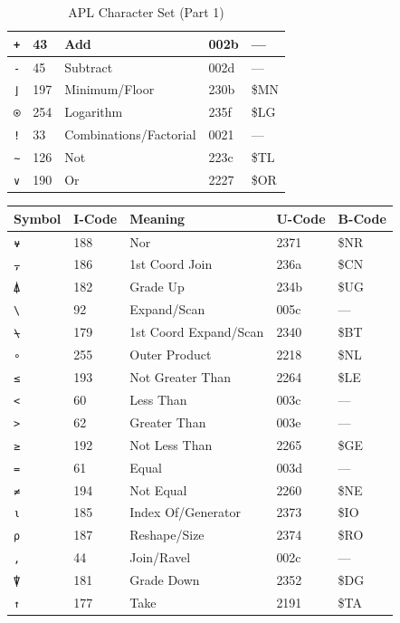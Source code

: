 \documentclass[a4paper,twoside,11pt]{article}
\begin{document}
\begin{table}
\begin{tabular}{||l|l|l|l|l||}
\texttt{+} & 43 & Add & 002b & ---\\\hline
\texttt{-} & 45 & Subtract & 002d & ---\\\hline
\texttt{⌋} & 197 & Minimum/Floor & 230b & \$MN\\\hline
\texttt{⍟} & 254 & Logarithm & 235f & \$LG\\\hline
\texttt{!} & 33 & Combinations/Factorial & 0021 & ---\\\hline
\texttt{∼} & 126 & Not & 223c & \$TL\\\hline
\texttt{∨} & 190 & Or & 2227 & \$OR\\\hline
\hline\hline
\end{tabular}
\caption{APL Character Set (Part 1)}
\label{tab:aplcs1}
\end{table}
\begin{table}
\centering
\begin{tabular}{||l|l|l|l|l||}
\hline\hline
Symbol&I-Code&Meaning&U-Code&B-Code\\
\hline
\texttt{⍱} & 188 & Nor & 2371 & \$NR\\\hline
\texttt{⍪} & 186 & 1st Coord Join & 236a & \$CN\\\hline
\texttt{⍋} & 182 & Grade Up & 234b & \$UG\\\hline
\texttt{\textbackslash{}} & 92 & Expand/Scan & 005c & ---\\\hline
\texttt{⍀} & 179 & 1st Coord Expand/Scan & 2340 & \$BT\\\hline
\texttt{∘} & 255 & Outer Product & 2218 & \$NL\\\hline
\texttt{≤} & 193 & Not Greater Than & 2264 & \$LE\\\hline
\texttt{<} & 60 & Less Than & 003c & ---\\\hline
\texttt{>} & 62 & Greater Than & 003e & ---\\\hline
\texttt{≥} & 192 & Not Less Than & 2265 & \$GE\\\hline
\texttt{=} & 61 & Equal & 003d & ---\\\hline
\texttt{≠} & 194 & Not Equal & 2260 & \$NE\\\hline
\texttt{⍳} & 185 & Index Of/Generator & 2373 & \$IO\\\hline
\texttt{⍴} & 187 & Reshape/Size & 2374 & \$RO\\\hline
\texttt{,} & 44 & Join/Ravel & 002c & ---\\\hline
\texttt{⍒} & 181 & Grade Down & 2352 & \$DG\\\hline
\texttt{↑} & 177 & Take & 2191 & \$TA\\\hline

\end{tabular}
\end{table}
\end{document}
